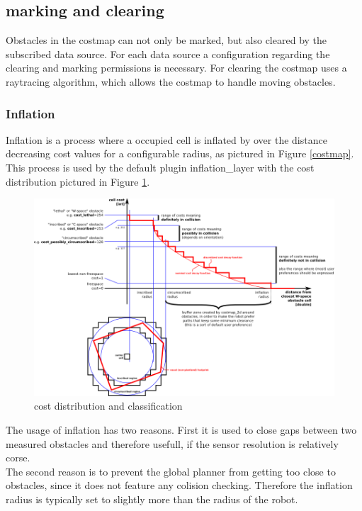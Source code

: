 \subsection{marking and clearing}
Obstacles in the costmap can not only be marked, but also cleared by the subscribed data source. For each data source a configuration regarding the clearing and marking permissions is necessary. For clearing the costmap uses a raytracing algorithm, which allows the costmap to handle moving obstacles\cite{costmap}.
\subsubsection{Inflation}
Inflation is a process where a occupied cell is inflated by over the distance decreasing cost values for a configurable radius, as pictured in Figure \ref{costmap}.\\
This process is used by the default plugin inflation\_layer with the cost distribution pictured in Figure \ref{costdistribution}\cite{costmap}.

\begin{figure}[H]
	\centering
	\includegraphics[width=\linewidth]{Pictures/costmapinflation}
	\caption{cost distribution and classification \cite{costmap}}
	\label{costdistribution}
\end{figure}

The usage of inflation has two reasons. First it is used to close gaps between two measured obstacles and therefore usefull, if the sensor resolution is relatively corse.\\
The second reason is to prevent the global planner from getting too close to obstacles, since it does not feature any colision checking. Therefore the inflation radius is typically set to slightly more than the radius of the robot\cite{costmap}.

